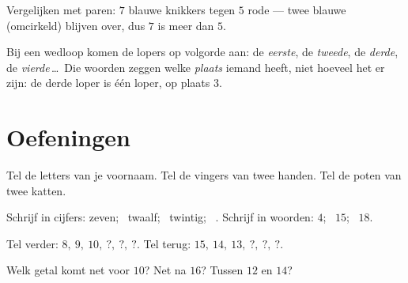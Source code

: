 \begin{omfigure}

{\small Vergelijken met paren: $7$ blauwe knikkers tegen $5$ rode ---
twee blauwe (omcirkeld) blijven over, dus $7$ is meer dan $5$.}
\end{omfigure}

\begin{example}\label{ex:g1:counting:ordinal}
Bij een wedloop komen de lopers op volgorde aan: de \emph{eerste}, de
\emph{tweede}, de \emph{derde}, de \emph{vierde}\,\dots\ Die woorden
zeggen welke \emph{plaats} iemand heeft, niet hoeveel het er zijn: de
derde loper is één loper, op plaats $3$.
\end{example}

\section{Oefeningen}

\begin{exercise}[$\star$]\label{exo:g1:counting:1}
Tel de letters van je voornaam. Tel de vingers van twee handen. Tel de
poten van twee katten.
\end{exercise}

\begin{exercise}[$\star$]\label{exo:g1:counting:2}
Schrijf in cijfers: zeven; \ twaalf; \ twintig; \ . Schrijf in
woorden: $4$; \ $15$; \ $18$.
\end{exercise}

\begin{exercise}[$\star$]\label{exo:g1:counting:3}
Tel verder: $8,\ 9,\ 10,\ ?,\ ?,\ ?$. Tel terug:
$15,\ 14,\ 13,\ ?,\ ?,\ ?$.
\end{exercise}

\begin{exercise}[$\star$]\label{exo:g1:counting:4}
Welk getal komt net voor $10$? Net na $16$? Tussen $12$ en $14$?
\end{exercise}

